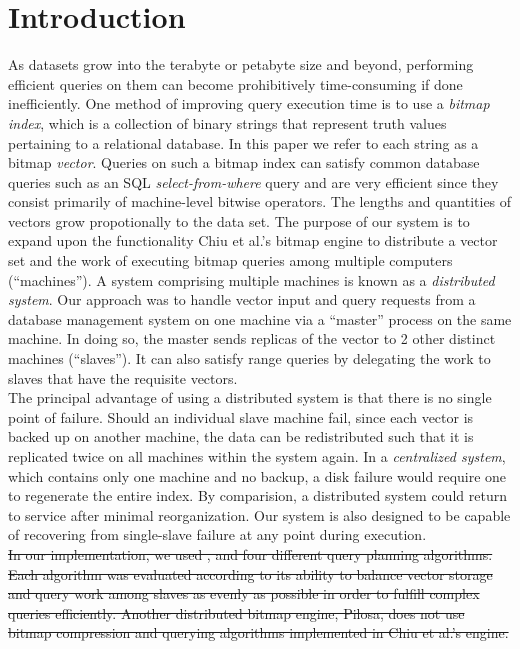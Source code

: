 \section{Introduction}
As datasets grow into the terabyte or petabyte size and beyond, performing efficient queries on them can become prohibitively time-consuming if done inefficiently.
One method of improving query execution time is to use a \emph{bitmap index}, which is a collection of binary strings that represent truth values pertaining to a relational database. In this paper we refer to each string as a bitmap \emph{vector}.
Queries on such a bitmap index can satisfy common database queries such as an SQL \emph{select-from-where} query and are very efficient since they consist primarily of machine-level bitwise operators.
The lengths and quantities of vectors grow propotionally to the data set. \cite{}
The purpose of our system is to expand upon the functionality Chiu et al.'s bitmap engine to distribute a vector set and the work of executing bitmap queries among multiple computers (``machines''). A system comprising multiple machines is known as a \emph{distributed system}.
Our approach was to handle vector input and query requests from a database management system on one machine via a ``master'' process on the same machine.
In doing so, the master sends replicas of the vector to 2 other distinct machines (``slaves'').
It can also satisfy range queries by delegating the work to slaves that have the requisite vectors.
\\\indent
The principal advantage of using a distributed system is that there is no single point of failure.
Should an individual slave machine fail, since each vector is backed up on another machine, the data can be redistributed such that it is replicated twice on all machines within the system again. In a \emph{centralized system}, which contains only one machine and no backup, a disk failure would require one to regenerate the entire index. By comparision, a distributed system could return to service after minimal reorganization. Our system is also designed to be capable of recovering from single-slave failure at any point during execution.
\\\indent
\sout{In our implementation, we used , and four different query planning algorithms.
Each algorithm was evaluated according to its ability to balance vector storage and query work among slaves as evenly as possible in order to fulfill complex queries efficiently.
Another distributed bitmap engine, Pilosa, does not use bitmap compression and querying algorithms implemented in Chiu et al.’s engine.}
